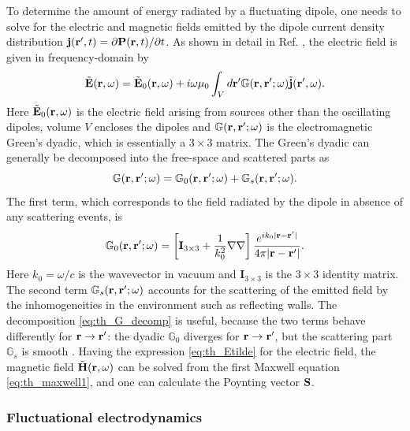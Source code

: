 To determine the amount of energy radiated by a fluctuating dipole, one needs to solve for the electric and magnetic fields emitted by the dipole current density distribution $\mathbf{j}(\mathbf{r}',t)=\partial \mathbf{P}(\mathbf{r},t)/\partial t$. As shown in detail in Ref. \cite{novotny}, the electric field is given in frequency-domain by 
\begin{equation}
 \tilde {\mathbf{E}}(\mathbf{r},\omega) = \tilde {\mathbf{E}}_0(\mathbf{r},\omega) + i \omega \mu_0 \int_V d\mathbf{r}' \mathbb{G}(\mathbf{r},\mathbf{r}';\omega) \tilde{\mathbf{j}}(\mathbf{r}',\omega). \label{eq:th_Etilde}
\end{equation}
Here $\tilde{\mathbf{E}}_0(\mathbf{r},\omega)$ is the electric field arising from sources other than the oscillating dipoles, volume $V$ encloses the dipoles and $\mathbb{G}(\mathbf{r},\mathbf{r}';\omega)$ is the electromagnetic Green's dyadic, which is essentially a $3\times 3$ matrix. The Green's dyadic can generally be decomposed into the free-space and scattered parts as
\begin{equation}
 \mathbb{G}(\mathbf{r},\mathbf{r}';\omega ) = \mathbb{G}_0(\mathbf{r},\mathbf{r}';\omega ) + \mathbb{G}_s(\mathbf{r},\mathbf{r}';\omega ). \label{eq:th_G_decomp}
\end{equation}
The first term, which corresponds to the field radiated by the dipole in absence of any scattering events, is \cite{novotny}
\begin{equation}
 \mathbb{G}_0(\mathbf{r},\mathbf{r}';\omega) = \left[\mathbf{I}_{3\times 3} + \frac{1}{k_0^2} \nabla \nabla \right] \frac{e^{ik_0|\mathbf{r}-\mathbf{r}'|}}{4\pi|\mathbf{r}-\mathbf{r}'|}.
\end{equation}
Here $k_0=\omega/c$ is the wavevector in vacuum and $\mathbf{I}_{3\times 3}$ is the $3\times 3$ identity matrix. The second term $\mathbb{G}_s(\mathbf{r},\mathbf{r}';\omega)$ accounts for the scattering of the emitted field by the inhomogeneities in the environment such as reflecting walls. The decomposition \eqref{eq:th_G_decomp} is useful, because the two terms behave differently for $\mathbf{r}\to \mathbf{r}'$: the dyadic $\mathbb{G}_0$ diverges for $\mathbf{r}\to \mathbf{r}'$, but the scattering part $\mathbb{G}_s$ is smooth \cite{novotny}. Having the expression \eqref{eq:th_Etilde} for the electric field, the magnetic field $\tilde{\mathbf{H}}(\mathbf{r},\omega)$ can be solved from the first Maxwell equation \eqref{eq:th_maxwell1}, and one can calculate the Poynting vector $\mathbf{S}$.

\subsubsection{Fluctuational electrodynamics}

